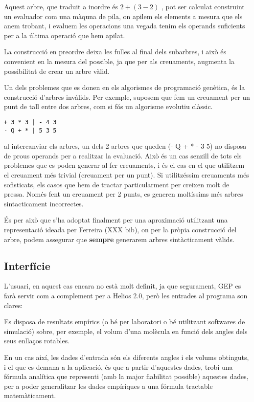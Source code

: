 \documentclass[titlepage,a4paper,12pt]{book}
\begin{document}
Aquest arbre, que traduit a inordre és $ 2 + (3 -2) $ , pot ser calculat
construint un evaluador com una màquna de pila, on apilem els elements a mesura
que els anem trobant, i evaluem les operacions una vegada tenim els operands
suficients per a la última operació que hem apilat.

La construcció en preordre deixa les fulles al final dels subarbres, i això és
convenient en la mesura del possible, ja que per als creuaments, augmenta la
possibilitat de crear un arbre vàlid. %

Un dels problemes que es donen en els algorismes de programació genètica, és la
construcció d'arbres invàlids. Per exemple, suposem que fem un creuament per un
punt de tall entre dos arbres, com si fós un algorisme evolutiu clàssic.

\begin{verbatim}
+ 3 * 3 | - 4 3
- Q + * | 5 3 5
\end{verbatim}

al intercanviar els arbres, un dels 2 arbres que queden (- Q + * - 3 5) no
disposa de prous operands per a realitzar la evaluació.  Això és un cas senzill
de tots els problemes que es poden generar al fer creuaments, i és el cas en el
que utilitzem el creuament més trivial (creuament per un punt). Si utilitzéssim
creuaments més sofisticats, els casos que hem de tractar particularment per
creixen molt de pressa.  Només fent un creuament per 2 punts, es generen
moltíssims més arbres sintacticament incorrectes.

És per això que s'ha adoptat finalment per una aproximació utilitzant una
representació ideada per Ferreira (XXX bib), on per la pròpia construcció del
arbre, podem assegurar que \textbf{sempre} generarem arbres sintàcticament
vàlids.

\subsection{Interfície} %
\label{sub:Interficie}

L'usuari, en aquest cas encara no està molt definit, ja que segurament, GEP es
farà servir com a complement per a Helios 2.0, però les entrades al programa son
clares:

Es disposa de resultats empírics (o bé per laboratori o bé utilitzant softwares
de simulació) sobre, per exemple, el volum d'una molècula en funció dels angles
dels seus enllaços rotables.

En un cas així, les dades d'entrada són els diferents angles i els volums
obtinguts, i el que es demana a la aplicació, és que a partir d'aquestes dades,
trobi una fórmula analítica que representi (amb la major fiabilitat possible)
aquestes dades, per a poder generalitzar les dades empíriques a una fórmula
tractable matemàticament.
\end{document}
